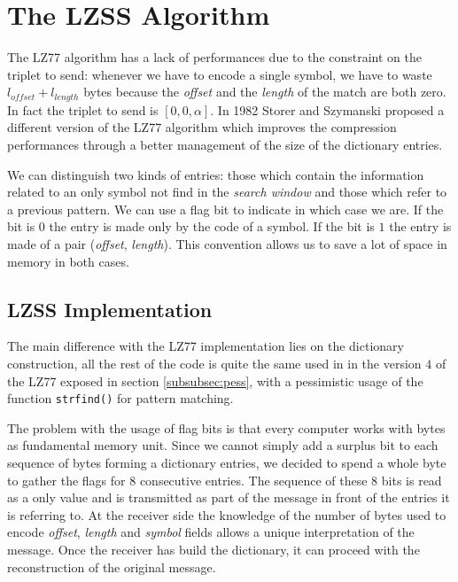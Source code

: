 \section{The LZSS Algorithm}
The LZ77 algorithm has a lack of performances due to the constraint on the triplet to send: whenever we have to encode a single symbol, we have to waste $l_{offset} + l_{length}$ bytes because the \textit{offset} and the \textit{length} of the match are both zero. In fact the triplet to send is $[0, 0, \alpha]$. In 1982 Storer and Szymanski \cite{storer1} proposed a different version of the LZ77 algorithm which improves the compression performances through a better management of the size of the dictionary entries.

We can distinguish two kinds of entries: those which contain the information related to an only symbol not find in the \textit{search window} and those which refer to a previous pattern. We can use a flag bit to indicate in which case we are. If the bit is $0$ the entry is made only by the code of a symbol. If the bit is $1$ the entry is made of a pair (\textit{offset}, \textit{length}). This convention allows us to save a lot of space in memory in both cases.

\subsection{LZSS Implementation}
The main difference with the LZ77 implementation lies on the dictionary construction, all the rest of the code is quite the same used in in the version $4$ of the LZ77 exposed in section \ref{subsubsec:pess}, with a pessimistic usage of the function \texttt{strfind()} for pattern matching.

The problem with the usage of flag bits is that every computer works with bytes as fundamental memory unit. Since we cannot simply add a surplus bit to each sequence of bytes forming a dictionary entries, we decided to spend a whole byte to gather the flags for $8$ consecutive entries. The sequence of these $8$ bits is read as a only value and is transmitted as part of the message in front of the entries it is referring to. At the receiver side the knowledge of the number of bytes used to encode \textit{offset}, \textit{length} and \textit{symbol} fields allows a unique interpretation of the message. Once the receiver has build the dictionary, it can proceed with the reconstruction of the original message.